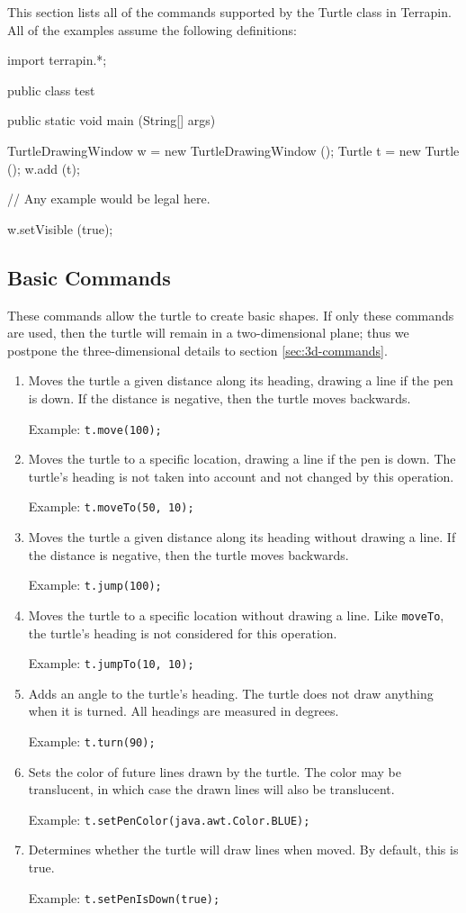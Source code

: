 \documentclass{article}
\newenvironment{commandtable}
  {\begin{enumerate}}
  {\end{enumerate}}
\def\command[#1]{\item[\tt #1]}
\def\example[#1]{\par Example: {\tt #1}}
\begin{document}
    This section lists all of the commands supported by the Turtle class in
    Terrapin. All of the examples assume the following definitions:

    \lstset{gobble=6}
    \begin{java}
      import terrapin.*;

      public class test {
	public static void main (String[] args) {
	  TurtleDrawingWindow w = new TurtleDrawingWindow ();
	  Turtle t = new Turtle ();
	  w.add (t);
	  
	  // Any example would be legal here.

	  w.setVisible (true);
	}
      }
    \end{java}

    \subsection{Basic Commands}
      \label{sec:basic-commands}

      These commands allow the turtle to create basic shapes. If only these
      commands are used, then the turtle will remain in a two-dimensional plane;
      thus we postpone the three-dimensional details to section
      \ref{sec:3d-commands}.

      \begin{commandtable}
	\command[move]
	Moves the turtle a given distance along its heading, drawing a line if
	the pen is down. If the distance is negative, then the turtle moves
	backwards.
	\example[t.move(100);]

	\command[moveTo]
	Moves the turtle to a specific location, drawing a line if the pen is
	down. The turtle's heading is not taken into account and not changed by
	this operation.
	\example[t.moveTo(50, 10);]

	\command[jump]
	Moves the turtle a given distance along its heading without drawing a
	line. If the distance is negative, then the turtle moves backwards.
	\example[t.jump(100);]

	\command[jumpTo]
	Moves the turtle to a specific location without drawing a line. Like
	{\tt moveTo}, the turtle's heading is not considered for this operation.
	\example[t.jumpTo(10, 10);]

	\command[turn]
	Adds an angle to the turtle's heading. The turtle does not draw anything
	when it is turned. All headings are measured in degrees.
	\example[t.turn(90);]

	\command[setPenColor]
	Sets the color of future lines drawn by the turtle. The color may be
	translucent, in which case the drawn lines will also be translucent.
	\example[t.setPenColor(java.awt.Color.BLUE);]

	\command[setPenIsDown]
	Determines whether the turtle will draw lines when moved. By default,
	this is true.
	\example[t.setPenIsDown(true);]
      \end{commandtable}
\end{document}
